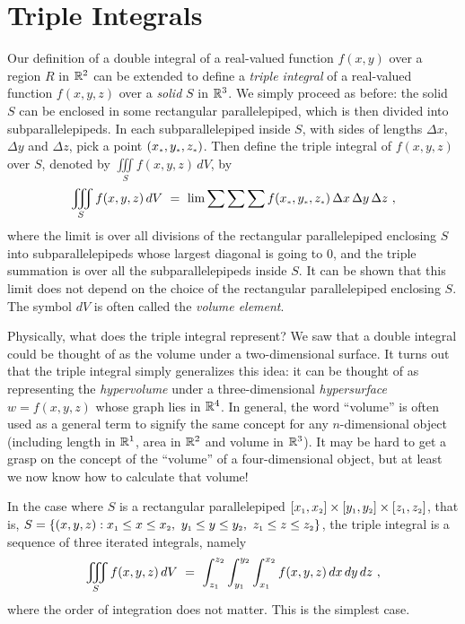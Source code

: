 \section{Triple Integrals}
Our definition of a double integral of a real-valued function $f(x,y)$ over a region $R$ in $\mathbb{R}^{2}$ can be
extended to define a \emph{triple integral} of a real-valued function $f(x,y,z)$ over a \emph{solid} $S$ in
$\mathbb{R}^{3}$. We simply proceed as before: the solid $S$ can be enclosed in some rectangular parallelepiped, which is
then divided into subparallelepipeds. In each subparallelepiped inside $S$, with sides of lengths $\Delta x$,
$\Delta y$ and $\Delta z$, pick a point $(x_{\scriptscriptstyle *},y_{\scriptscriptstyle *},z_{\scriptscriptstyle *})$. 
Then define the triple
integral of $f(x,y,z)$ over $S$, denoted by $\iiint\limits_{S} f(x,y,z)\,dV$, by\index{$\iiint$}
\begin{equation}
 \iiint\limits_{S} f(x,y,z)\,dV ~=~
  \lim \sum \sum \sum f(x_{\scriptscriptstyle *},y_{\scriptscriptstyle *},z_{\scriptscriptstyle *})\,\Delta x\,\Delta y\,\Delta z ~,
\end{equation}
where the limit is over all divisions of the rectangular parallelepiped enclosing $S$ into subparallelepipeds whose
largest diagonal is going to $0$, and the triple summation is over all the subparallelepipeds inside $S$. It can be
shown that this limit does not depend on the choice of the rectangular parallelepiped enclosing $S$. The symbol $dV$
is often called the \emph{volume element}.

Physically,
what does the triple integral represent? We saw that a double integral could be thought of as the volume under a
two-dimensional surface. It turns out that the triple integral simply generalizes this idea: it can be thought of as
representing the \emph{hypervolume} under a three-dimensional \emph{hypersurface} $w=f(x,y,z)$ whose graph lies in
$\mathbb{R}^{4}$. In general, the word ``volume'' is
often used as a general term to signify the same concept for any $n$-dimensional object 
(including length in $\mathbb{R}^{1}$, area in $\mathbb{R}^{2}$ and volume in $\mathbb{R}^{3}$). 
It may be hard to get a grasp on the
concept of the ``volume'' of a four-dimensional object, but at least we now know how to calculate that volume!

In the case where $S$ is a rectangular parallelepiped
$\lbrack x_{\scriptscriptstyle 1},x_{\scriptscriptstyle 2} \rbrack \times \lbrack y_{\scriptscriptstyle 1},y_{\scriptscriptstyle 2} \rbrack \times \lbrack
z_{\scriptscriptstyle 1},z_{\scriptscriptstyle 2} \rbrack$, that is, $S = \lbrace (x,y,z): x_{\scriptscriptstyle 1} \le x \le x_{\scriptscriptstyle 2},~
y_{\scriptscriptstyle 1} \le y \le y_{\scriptscriptstyle 2},~z_{\scriptscriptstyle 1} \le z \le z_{\scriptscriptstyle 2} \rbrace$, the triple integral is a sequence
of three iterated integrals, namely
\begin{equation}
 \iiint\limits_{S} f(x,y,z)\,dV ~=~
  \int_{z_{\scriptscriptstyle 1}}^{z_{\scriptscriptstyle 2}} \int_{y_{\scriptscriptstyle 1}}^{y_{\scriptscriptstyle 2}} \int_{x_{\scriptscriptstyle 1}}^{x_{\scriptscriptstyle 2}} f(x,y,z)\,
  dx\,dy\,dz ~,
\end{equation}
where the order of integration does not matter. This is the simplest case.

